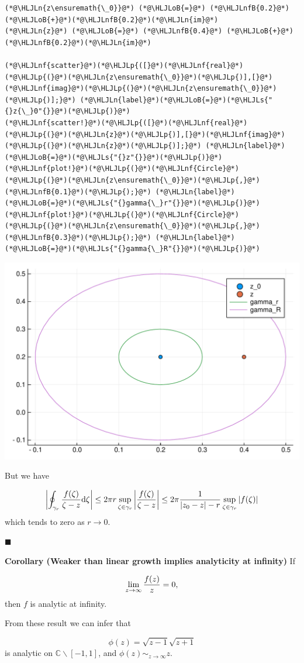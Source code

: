 \documentclass[12pt,a4paper]{article}
\newcommand{\HLJLn}[1]{#1}
\newcommand{\HLJLnf}[1]{\textcolor[RGB]{66,102,213}{#1}}
\newcommand{\HLJLs}[1]{\textcolor[RGB]{201,61,57}{#1}}
\newcommand{\HLJLnfB}[1]{\textcolor[RGB]{59,151,46}{#1}}
\newcommand{\HLJLoB}[1]{\textcolor[RGB]{102,102,102}{\textbf{#1}}}
\newcommand{\HLJLp}[1]{#1}
\def\D{ {\rm d} }
\def\C{ {\mathbb C} }
\def\mdblksquare{\blacksquare}
\begin{document}
\begin{lstlisting}
(*@\HLJLn{z\ensuremath{\_0}}@*) (*@\HLJLoB{=}@*) (*@\HLJLnfB{0.2}@*) (*@\HLJLoB{+}@*)(*@\HLJLnfB{0.2}@*)(*@\HLJLn{im}@*)
(*@\HLJLn{z}@*) (*@\HLJLoB{=}@*) (*@\HLJLnfB{0.4}@*) (*@\HLJLoB{+}@*)(*@\HLJLnfB{0.2}@*)(*@\HLJLn{im}@*)

(*@\HLJLnf{scatter}@*)(*@\HLJLp{([}@*)(*@\HLJLnf{real}@*)(*@\HLJLp{(}@*)(*@\HLJLn{z\ensuremath{\_0}}@*)(*@\HLJLp{)],[}@*)(*@\HLJLnf{imag}@*)(*@\HLJLp{(}@*)(*@\HLJLn{z\ensuremath{\_0}}@*)(*@\HLJLp{)];}@*) (*@\HLJLn{label}@*)(*@\HLJLoB{=}@*)(*@\HLJLs{"{}z{\_}0"{}}@*)(*@\HLJLp{)}@*)
(*@\HLJLnf{scatter!}@*)(*@\HLJLp{([}@*)(*@\HLJLnf{real}@*)(*@\HLJLp{(}@*)(*@\HLJLn{z}@*)(*@\HLJLp{)],[}@*)(*@\HLJLnf{imag}@*)(*@\HLJLp{(}@*)(*@\HLJLn{z}@*)(*@\HLJLp{)];}@*) (*@\HLJLn{label}@*)(*@\HLJLoB{=}@*)(*@\HLJLs{"{}z"{}}@*)(*@\HLJLp{)}@*)
(*@\HLJLnf{plot!}@*)(*@\HLJLp{(}@*)(*@\HLJLnf{Circle}@*)(*@\HLJLp{(}@*)(*@\HLJLn{z\ensuremath{\_0}}@*)(*@\HLJLp{,}@*) (*@\HLJLnfB{0.1}@*)(*@\HLJLp{);}@*) (*@\HLJLn{label}@*)(*@\HLJLoB{=}@*)(*@\HLJLs{"{}gamma{\_}r"{}}@*)(*@\HLJLp{)}@*)
(*@\HLJLnf{plot!}@*)(*@\HLJLp{(}@*)(*@\HLJLnf{Circle}@*)(*@\HLJLp{(}@*)(*@\HLJLn{z\ensuremath{\_0}}@*)(*@\HLJLp{,}@*) (*@\HLJLnfB{0.3}@*)(*@\HLJLp{);}@*) (*@\HLJLn{label}@*)(*@\HLJLoB{=}@*)(*@\HLJLs{"{}gamma{\_}R"{}}@*)(*@\HLJLp{)}@*)
\end{lstlisting}

\includegraphics[width=\linewidth]{figures/Lecture10_11_1.pdf}

But we have

\[
    \left|  \oint_{\gamma_r} {f(\zeta) \over \zeta - z} \D \zeta \right| \leq 2\pi r \sup_{\zeta \in \gamma_r} \left|{f(\zeta) \over \zeta - z}\right| \leq 2 \pi  {1 \over |z_0-z| - r} \sup_{\zeta \in \gamma_r} |f(\zeta)|
\]
which tends to zero as $r \rightarrow 0$.

\ensuremath{\mdblksquare}

\textbf{Corollary (Weaker than linear growth implies analyticity at infinity)} If 

\[
\lim_{z \rightarrow \infty} {f(z)  \over z} = 0,
\]
then $f$ is analytic at infinity.

From these result we can infer that 

\[
\phi(z) = \sqrt{z-1}\sqrt{z+1}
\]
is analytic on $\C \backslash [-1,1]$, and $\phi(z) \sim_{z \rightarrow \infty} z$.
\end{document}
